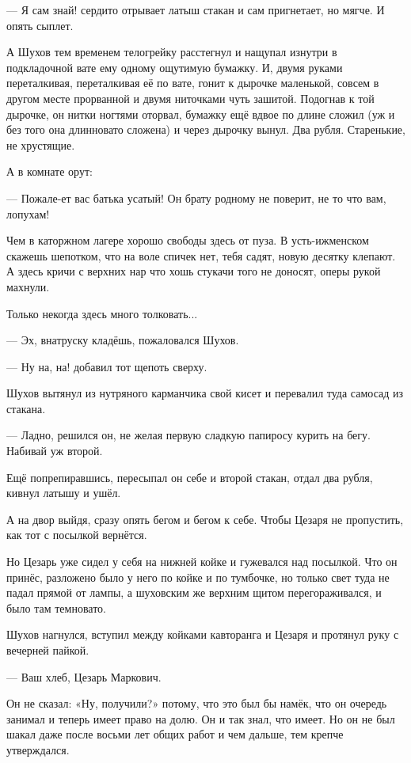 --- Я сам знай! \dash сердито отрывает латыш стакан и сам пригнетает, но мягче. И опять сыплет.

А Шухов тем временем телогрейку расстегнул и нащупал изнутри в подкладочной вате ему одному
ощутимую бумажку. И, двумя руками переталкивая, переталкивая её по вате, гонит к дырочке
маленькой, совсем в другом месте прорванной и двумя ниточками чуть зашитой. Подогнав к той
дырочке, он нитки ногтями оторвал, бумажку ещё вдвое по длине сложил (уж и без того она
длинновато сложена) и через дырочку вынул. Два рубля. Старенькие, не хрустящие.

А в комнате орут:

--- Пожале-ет вас батька усатый! Он брату родному не поверит, не то что вам, лопухам!

Чем в каторжном лагере хорошо \dash свободы здесь от пуза. В усть-ижменском скажешь шепотком,
что на воле спичек нет, тебя садят, новую десятку клепают. А здесь кричи с верхних нар что
хошь \dash стукачи того не доносят, оперы рукой махнули.

Только некогда здесь много толковать...

--- Эх, внатруску кладёшь, \dash пожаловался Шухов.

--- Ну на, на! \dash добавил тот щепоть сверху.

Шухов вытянул из нутряного карманчика свой кисет и перевалил туда самосад из стакана.

--- Ладно, \dash решился он, не желая первую сладкую папиросу курить на бегу. \Dash Набивай уж второй.

Ещё попрепиравшись, пересыпал он себе и второй стакан, отдал два рубля, кивнул латышу и ушёл.

А на двор выйдя, сразу опять бегом и бегом к себе. Чтобы Цезаря не пропустить, как тот с
посылкой вернётся.

Но Цезарь уже сидел у себя на нижней койке и гужевался над посылкой. Что он принёс, разложено
было у него по койке и по тумбочке, но только свет туда не падал прямой от лампы, а шуховским
же верхним щитом перегораживался, и было там темновато.

Шухов нагнулся, вступил между койками кавторанга и Цезаря и протянул руку с вечерней пайкой.

--- Ваш хлеб, Цезарь Маркович.

Он не сказал: «Ну, получили?» \dash потому, что это был бы намёк, что он очередь занимал и теперь
имеет право на долю. Он и так знал, что имеет. Но он не был шакал даже после восьми лет общих
работ \dash и чем дальше, тем крепче утверждался.

